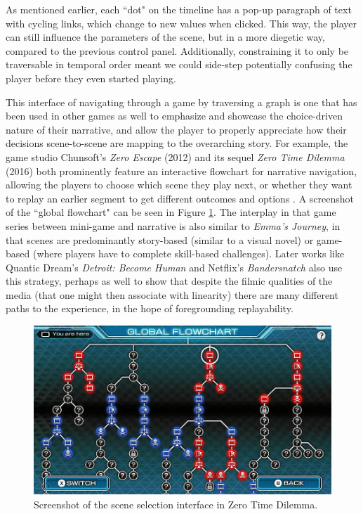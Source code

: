 As mentioned earlier, each ``dot" on the timeline has a pop-up paragraph of text with cycling links, which change to new values when clicked. This way, the player can still influence the parameters of the scene, but in a more diegetic way, compared to the previous control panel. Additionally, constraining it to only be traversable in temporal order meant we could side-step potentially confusing the player before they even started playing.

This interface of navigating through a game by traversing a graph is one that has been used in other games as well to emphasize and showcase the choice-driven nature of their narrative, and allow the player to properly appreciate how their decisions scene-to-scene are mapping to the overarching story. For example, the game studio Chunsoft's \textit{Zero Escape} (2012) and its sequel \textit{Zero Time Dilemma} (2016) both prominently feature an interactive flowchart for narrative navigation, allowing the players to choose which scene they play next, or whether they want to replay an earlier segment to get different outcomes and options \cite{mackey_2016}. A screenshot of the ``global flowchart" can be seen in Figure \ref{fig:ref-plot-diagram}. The interplay in that game series between mini-game and narrative is also similar to \textit{Emma's Journey}, in that scenes are predominantly story-based (similar to a visual novel) or game-based (where players have to complete skill-based challenges). Later works like Quantic Dream's \textit{Detroit: Become Human} \cite{dream2016detroit} and Netflix's \textit{Bandersnatch} \cite{bandersnatch} also use this strategy, perhaps as well to show that despite the filmic qualities of the media (that one might then associate with linearity) there are many different paths to the experience, in the hope of foregrounding replayability.


\begin{figure}
    \centering
    \includegraphics[width=\textwidth]{figures/3-StoryAssembler/ref-plot-diagram.png}
    \caption{Screenshot of the scene selection interface in Zero Time Dilemma.}
    \label{fig:ref-plot-diagram}
\end{figure}

